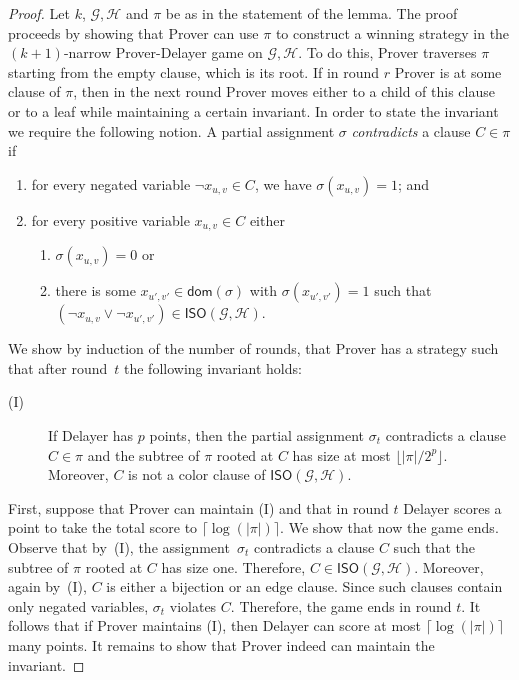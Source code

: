 \documentclass[10pt,a4paper]{article}
\newcommand{\defining}[1]{\emph{#1}}
\newcommand{\graphG}{\mathcal{G}}
\newcommand{\graphH}{\mathcal{H}}
\newcommand{\dom}{\mathsf{dom}}
\newcommand{\ISO}{\mathsf{ISO}(\graphG, \graphH)}
\begin{document}
%
\begin{proof}
Let $k$, $\graphG, \graphH$ and $\pi$ be as in the statement of the lemma. The proof proceeds by showing that Prover can use $\pi$ to construct a winning strategy in the $(k+1)$-narrow Prover-Delayer game on $\graphG, \graphH$.
To do this, Prover traverses $\pi$ starting from the empty clause, which is its root. If in round $r$ Prover is at some clause of $\pi$, then in the next round Prover moves either to a child of this clause or to a leaf while maintaining a certain invariant. 
In order to state the invariant we require the following notion.
A partial assignment $\sigma$ \defining{contradicts} a clause $C \in \pi$ if
\begin{enumerate}
\item for every negated variable $\neg x_{u,v} \in C$, we have $\sigma(x_{u,v}) = 1$; and 
\item for every positive variable $x_{u,v} \in C$ either
\begin{enumerate}
\item $\sigma(x_{u,v}) = 0$ or
\item there is some $x_{u',v'} \in \dom(\sigma)$ with $\sigma(x_{u', v'}) = 1$ such that $(\neg x_{u,v} \vee \neg x_{u', v'} ) \in \ISO$.
\end{enumerate} 
\end{enumerate}
\noindent We show by induction of the number of rounds,
that Prover has a strategy such that after round~$t$ the following invariant holds:
\begin{description}
\item[(I)]  If Delayer has $p$ points,
then the partial assignment $\sigma_{t}$ contradicts a clause $C \in \pi$
and the subtree of $\pi$ rooted at $C$ has size at most $\lfloor |\pi| / 2^p \rfloor$. Moreover, $C$ is not a color clause of $\ISO$.
\end{description}
 
First, suppose that Prover can maintain (I) and that in round $t$ Delayer scores a point to take the total score to $\lceil \log(|\pi|) \rceil$.
We show that now the game ends.
Observe that by~(I), the assignment~$\sigma_{t}$ contradicts a clause $C$ such that the 
subtree of $\pi$ rooted at $C$ has size one. Therefore, $C \in \ISO$. Moreover, again by~(I), $C$ is either a bijection or an edge clause. Since such clauses contain only negated variables, $\sigma_{t}$ violates $C$.
Therefore, the game ends in round $t$.
It follows that if Prover maintains (I), then Delayer can score at most $\lceil \log(|\pi|) \rceil$ many points.
It remains to show that Prover indeed can maintain the invariant.


\end{proof}
\end{document}
